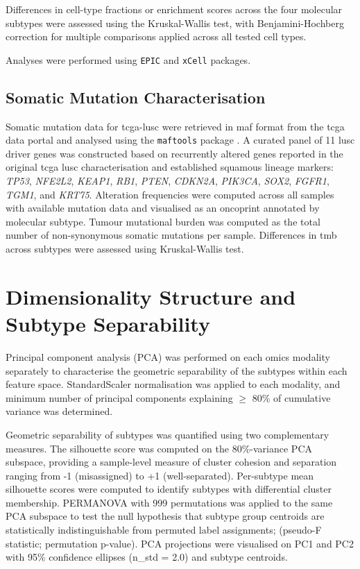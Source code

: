 Differences in cell-type fractions or enrichment scores across the four molecular subtypes were assessed using the Kruskal-Wallis test, with Benjamini-Hochberg correction for multiple comparisons applied across all tested cell types. 

Analyses were performed using \texttt{EPIC} and \texttt{xCell} packages.

\subsection{Somatic Mutation Characterisation}
\label{subsec:somatic_mutation_method}
 
Somatic mutation data for \gls{tcga}-\gls{lusc} were retrieved in \gls{maf} format from the \gls{tcga} data portal and analysed using the \texttt{maftools} package \parencite{Mayakonda2018maftools}. A curated panel of 11 \gls{lusc} driver genes was constructed based on recurrently altered genes reported in the original \gls{tcga} \gls{lusc} characterisation \parencite{Hammerman2012} and established squamous lineage markers: \textit{TP53}, \textit{NFE2L2}, \textit{KEAP1}, \textit{RB1}, \textit{PTEN}, \textit{CDKN2A}, \textit{PIK3CA}, \textit{SOX2}, \textit{FGFR1}, \textit{TGM1}, and \textit{KRT75}. Alteration frequencies were computed across all samples with available mutation data and visualised as an oncoprint annotated by molecular subtype. Tumour mutational burden was computed as the total number of non-synonymous somatic mutations per sample. Differences in \gls{tmb} across subtypes were assessed using Kruskal-Wallis test.


\section{Dimensionality Structure and Subtype Separability}
\label{sec:dataset_sep_method}
Principal component analysis (PCA) was performed on each omics modality separately to characterise the geometric separability of the subtypes within each feature space. StandardScaler normalisation was applied to each modality, and minimum number of principal components explaining $\geq$ 80\% of cumulative variance was determined. 

Geometric separability of subtypes was quantified using two complementary measures. The silhouette score was computed on the 80\%-variance PCA subspace, providing a sample-level measure of cluster cohesion and separation ranging from -1 (misassigned) to +1 (well-separated). Per-subtype mean silhouette scores were computed to identify subtypes with differential cluster membership. PERMANOVA with 999 permutations was applied to the same PCA subspace to test the null hypothesis that subtype group centroids are statistically indistinguishable from permuted label assignments; (pseudo-F statistic; permutation p-value). PCA projections were visualised on PC1 and PC2 with 95\% confidence ellipses (n\_std = 2.0) and subtype centroids.



